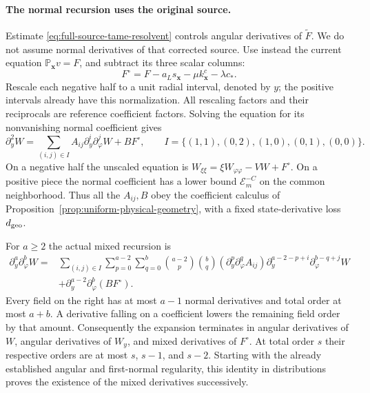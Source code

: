 \paragraph{The normal recursion uses the original source.}
Estimate \eqref{eq:full-source-tame-resolvent} controls angular
derivatives of $\widetilde F$. We do not assume normal derivatives
of that corrected source. Use instead the current equation
$\mathbb P_{\mathbf x}v=F$, and subtract its three scalar columns:
\[
 F^\circ=F-a_Ls_{\mathbf x}-\mu k_{\mathbf x}^c-\lambda c_*.
\]
Rescale each negative half to a unit radial interval, denoted by $y$;
the positive intervals already have this normalization. All rescaling
factors and their reciprocals are reference coefficient factors.
Solving the equation for its nonvanishing normal coefficient gives
\begin{equation}\label{eq:rewrite-normal-recursion-base}
 \partial_y^2W=\sum_{(i,j)\in I}A_{ij}\partial_y^i
                      \partial_\varphi^jW+B F^\circ,\qquad
 I=\{(1,1),(0,2),(1,0),(0,1),(0,0)\}.
\end{equation}
On a negative half the unscaled equation is
$W_{\xi\xi}=\xi W_{\varphi\varphi}-VW+F^\circ$.
On a positive piece the normal coefficient has a lower bound
$\mathcal E_m^{-C}$ on the common neighborhood. Thus all the
$A_{ij},B$ obey the coefficient calculus of
Proposition~\ref{prop:uniform-physical-geometry}, with a fixed
state-derivative loss $d_{\rm geo}$.

For $a\ge2$ the actual mixed recursion is
\begin{equation}\label{eq:rewrite-mixed-normal-recursion}
 \begin{split}
 \partial_y^a\partial_\varphi^b W
 ={}&\sum_{(i,j)\in I}\sum_{p=0}^{a-2}\sum_{q=0}^{b}
       \binom{a-2}{p}\binom bq
       (\partial_y^p\partial_\varphi^q A_{ij})
       \partial_y^{a-2-p+i}\partial_\varphi^{b-q+j}W\\
 &+\partial_y^{a-2}\partial_\varphi^b(BF^\circ).
 \end{split}
\end{equation}
Every field on the right has at most $a-1$ normal derivatives
and total order at most $a+b$. A derivative falling on a
coefficient lowers the remaining field order by that amount.
Consequently the expansion terminates in angular derivatives of
$W$, angular derivatives of $W_y$, and mixed derivatives of
$F^\circ$. At total order $s$ their respective orders are at most
$s$, $s-1$, and $s-2$.
Starting with the already established angular and first-normal
regularity, this identity in distributions proves the existence of
the mixed derivatives successively.

